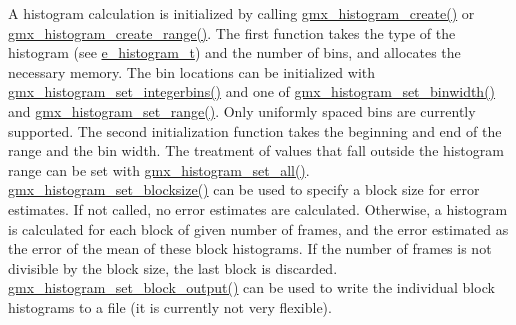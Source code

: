 \-A histogram calculation is initialized by calling \hyperlink{include_2histogram_8h_ab40d6fd1d54b3204f5daf564bf1d8dc3}{gmx\-\_\-histogram\-\_\-create()} or \hyperlink{include_2histogram_8h_a4651816f933b571639f58182cec55cc4}{gmx\-\_\-histogram\-\_\-create\-\_\-range()}. \-The first function takes the type of the histogram (see \hyperlink{share_2template_2gromacs_2histogram_8h_ae733abe5734389e4450335504bde8d0c}{e\-\_\-histogram\-\_\-t}) and the number of bins, and allocates the necessary memory. \-The bin locations can be initialized with \hyperlink{include_2histogram_8h_a2613ee595d411e01c5cc67e2ea62d963}{gmx\-\_\-histogram\-\_\-set\-\_\-integerbins()} and one of \hyperlink{include_2histogram_8h_aeedf50e7e41ad43592d9a13f59f5e8e2}{gmx\-\_\-histogram\-\_\-set\-\_\-binwidth()} and \hyperlink{include_2histogram_8h_ab536083f48600485e134db1a810edb5e}{gmx\-\_\-histogram\-\_\-set\-\_\-range()}. \-Only uniformly spaced bins are currently supported. \-The second initialization function takes the beginning and end of the range and the bin width. \-The treatment of values that fall outside the histogram range can be set with \hyperlink{include_2histogram_8h_afadb5475f53de1db1941b233ad58ae1e}{gmx\-\_\-histogram\-\_\-set\-\_\-all()}. \hyperlink{include_2histogram_8h_a4dc6019d346e922fe3b383b7480bb156}{gmx\-\_\-histogram\-\_\-set\-\_\-blocksize()} can be used to specify a block size for error estimates. \-If not called, no error estimates are calculated. \-Otherwise, a histogram is calculated for each block of given number of frames, and the error estimated as the error of the mean of these block histograms. \-If the number of frames is not divisible by the block size, the last block is discarded. \hyperlink{include_2histogram_8h_acf710ff31e487be33a29fe69f9373ff7}{gmx\-\_\-histogram\-\_\-set\-\_\-block\-\_\-output()} can be used to write the individual block histograms to a file (it is currently not very flexible).

